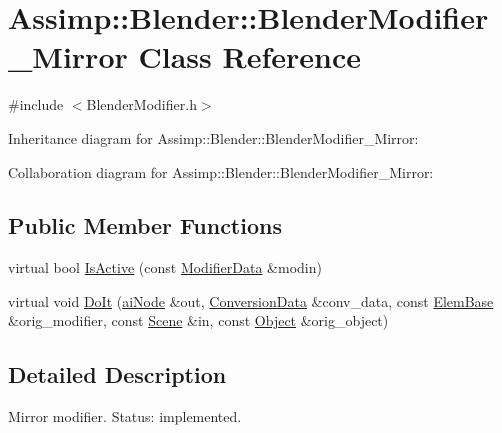 \hypertarget{class_assimp_1_1_blender_1_1_blender_modifier___mirror}{\section{Assimp\+:\+:Blender\+:\+:Blender\+Modifier\+\_\+\+Mirror Class Reference}
\label{class_assimp_1_1_blender_1_1_blender_modifier___mirror}
}


{\ttfamily \#include $<$Blender\+Modifier.\+h$>$}



Inheritance diagram for Assimp\+:\+:Blender\+:\+:Blender\+Modifier\+\_\+\+Mirror\+:


Collaboration diagram for Assimp\+:\+:Blender\+:\+:Blender\+Modifier\+\_\+\+Mirror\+:
\subsection*{Public Member Functions}
\begin{DoxyCompactItemize}
\item 
virtual bool \hyperlink{class_assimp_1_1_blender_1_1_blender_modifier___mirror_a09a384a82d846ddb469bb690b82f18d3}{Is\+Active} (const \hyperlink{struct_assimp_1_1_blender_1_1_modifier_data}{Modifier\+Data} \&modin)
\item 
virtual void \hyperlink{class_assimp_1_1_blender_1_1_blender_modifier___mirror_a3377492ecd500ec78505ff7887681911}{Do\+It} (\hyperlink{structai_node}{ai\+Node} \&out, \hyperlink{struct_assimp_1_1_blender_1_1_conversion_data}{Conversion\+Data} \&conv\+\_\+data, const \hyperlink{struct_assimp_1_1_blender_1_1_elem_base}{Elem\+Base} \&orig\+\_\+modifier, const \hyperlink{struct_assimp_1_1_blender_1_1_scene}{Scene} \&in, const \hyperlink{struct_assimp_1_1_blender_1_1_object}{Object} \&orig\+\_\+object)
\end{DoxyCompactItemize}


\subsection{Detailed Description}
Mirror modifier. Status\+: implemented. 

